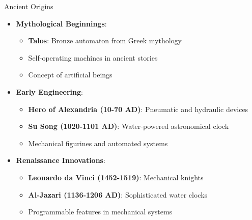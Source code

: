 \documentclass[aspectratio=169,11pt]{beamer}
\newcommand{\concept}[1]{\textbf{\color{accentcolor}#1}}
\begin{document}
\begin{frame}{Ancient Origins}
\begin{itemize}
\item \concept{Mythological Beginnings}:
\begin{itemize}
\item \textbf{Talos}: Bronze automaton from Greek mythology
\item Self-operating machines in ancient stories
\item Concept of artificial beings
\end{itemize}
\vspace{0.5cm}
\item \concept{Early Engineering}:
\begin{itemize}
\item \textbf{Hero of Alexandria (10-70 AD)}: Pneumatic and hydraulic devices
\item \textbf{Su Song (1020-1101 AD)}: Water-powered astronomical clock
\item Mechanical figurines and automated systems
\end{itemize}
\vspace{0.3cm}
\item \concept{Renaissance Innovations}:
\begin{itemize}
\item \textbf{Leonardo da Vinci (1452-1519)}: Mechanical knights
\item \textbf{Al-Jazari (1136-1206 AD)}: Sophisticated water clocks
\item Programmable features in mechanical systems
\end{itemize}
\end{itemize}
\end{frame}
\end{document}
